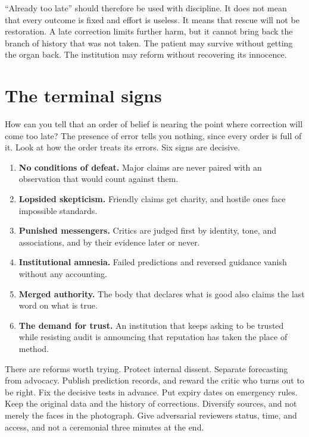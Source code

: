 \documentclass[12pt,a4paper]{book}
\begin{document}
``Already too late'' should therefore be used with discipline. It does not mean that every outcome is fixed and effort is useless. It means that rescue will not be restoration. A late correction limits further harm, but it cannot bring back the branch of history that was not taken. The patient may survive without getting the organ back. The institution may reform without recovering its innocence.

\section{The terminal signs}

How can you tell that an order of belief is nearing the point where correction will come too late? The presence of error tells you nothing, since every order is full of it. Look at how the order treats its errors. Six signs are decisive.

\begin{enumerate}
  \item \textbf{No conditions of defeat.} Major claims are never paired with an observation that would count against them.
  \item \textbf{Lopsided skepticism.} Friendly claims get charity, and hostile ones face impossible standards.
  \item \textbf{Punished messengers.} Critics are judged first by identity, tone, and associations, and by their evidence later or never.
  \item \textbf{Institutional amnesia.} Failed predictions and reversed guidance vanish without any accounting.
  \item \textbf{Merged authority.} The body that declares what is good also claims the last word on what is true.
  \item \textbf{The demand for trust.} An institution that keeps asking to be trusted while resisting audit is announcing that reputation has taken the place of method.
\end{enumerate}

There are reforms worth trying. Protect internal dissent. Separate forecasting from advocacy. Publish prediction records, and reward the critic who turns out to be right. Fix the decisive tests in advance. Put expiry dates on emergency rules. Keep the original data and the history of corrections. Diversify sources, and not merely the faces in the photograph. Give adversarial reviewers status, time, and access, and not a ceremonial three minutes at the end.
\end{document}
